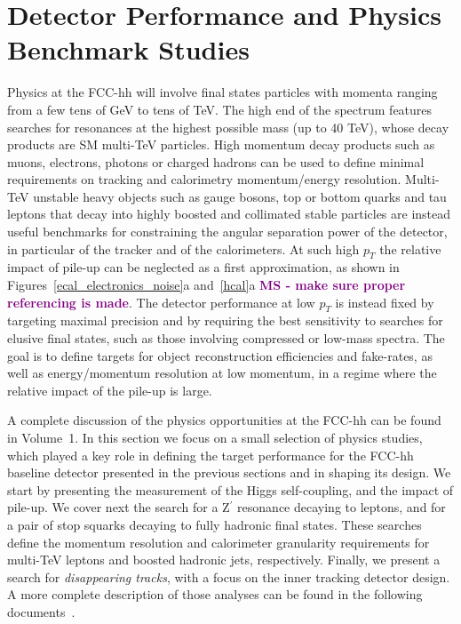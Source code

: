 \documentclass[11pt,twoside,a4paper]{cernrep}
\newcommand{\MS}[1]{\textbf{\textcolor{purple}{MS - #1}}}
\begin{document}

\section{Detector Performance and Physics Benchmark Studies}

Physics at the FCC-hh will involve final states particles with momenta ranging from a few tens of GeV to tens of TeV. The high end of the spectrum features searches for resonances at the highest possible mass (up to 40 TeV), whose decay products are SM multi-TeV particles. High momentum decay products such as muons, electrons, photons or charged hadrons can be used to define minimal requirements on tracking and calorimetry momentum/energy resolution. Multi-TeV unstable heavy objects such as gauge bosons, top or bottom quarks and tau leptons that decay into highly boosted and collimated stable particles are instead useful benchmarks for constraining the angular separation power of the detector, in particular of the tracker and of the calorimeters. At such high $p_{T}$ the relative impact of pile-up can be neglected as a first approximation, as shown in Figures~\ref{ecal_electronics_noise}a and~\ref{hcal}a \MS{make sure proper referencing is made}. The detector performance at low $p_{T}$ is instead fixed by targeting maximal precision and by requiring the best sensitivity to searches for elusive final states, such as those involving compressed or low-mass spectra. The goal is to define targets for object reconstruction efficiencies and fake-rates, as well as energy/momentum resolution at low momentum, in a regime where the relative impact of the pile-up is large.

A complete discussion of the physics opportunities at the FCC-hh can be found in Volume~1. In this section we focus on a small selection of physics studies, which played a key role in defining the target performance for the FCC-hh baseline detector presented in the previous sections and in shaping its design. We start by presenting the measurement of the Higgs self-coupling, and the impact of pile-up. We cover next the search for a Z$^{\prime}$ resonance decaying to leptons, and for a pair of stop squarks decaying to fully hadronic final states. These searches define the momentum resolution and calorimeter granularity requirements for multi-TeV leptons and boosted hadronic jets, respectively. Finally, we present a search for \emph{disappearing tracks}, with a focus on the inner tracking detector design. A more complete description of those analyses can be found in the following documents~\cite{Selvaggi:2642471,Helsens:2642473,Gouskos:2642475,Terashi:2642474}.
\end{document}
